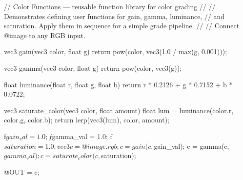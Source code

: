 // Color Functions — reusable function library for color grading
//
// Demonstrates defining user functions for gain, gamma, luminance,
// and saturation. Apply them in sequence for a simple grade pipeline.
//
// Connect @image to any RGB input.

vec3 gain(vec3 color, float g) {
    return pow(color, vec3(1.0 / max(g, 0.001)));
}

vec3 gamma(vec3 color, float g) {
    return pow(color, vec3(g));
}

float luminance(float r, float g, float b) {
    return r * 0.2126 + g * 0.7152 + b * 0.0722;
}

vec3 saturate_color(vec3 color, float amount) {
    float lum = luminance(color.r, color.g, color.b);
    return lerp(vec3(lum), color, amount);
}

f$gain_val = 1.0;
f$gamma_val = 1.0;
f$saturation = 1.0;

vec3 c = @image.rgb;
c = gain(c, $gain_val);
c = gamma(c, $gamma_val);
c = saturate_color(c, $saturation);

@OUT = c;